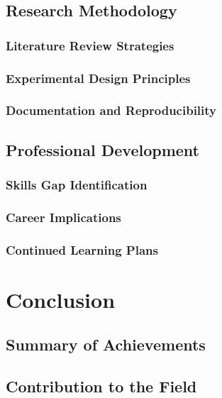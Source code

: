\documentclass[12pt,a4paper]{report}
\begin{document}
\section{Research Methodology}

\subsection{Literature Review Strategies}

\subsection{Experimental Design Principles}

\subsection{Documentation and Reproducibility}

\section{Professional Development}

\subsection{Skills Gap Identification}

\subsection{Career Implications}

\subsection{Continued Learning Plans}

\chapter{Conclusion}

\section{Summary of Achievements}

\section{Contribution to the Field}
\end{document}
